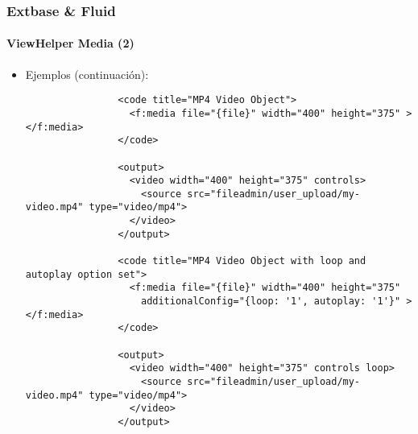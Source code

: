 \begin{frame}[fragile]
	\frametitle{Extbase \& Fluid}
	\framesubtitle{ViewHelper Media (2)}

	\lstset{basicstyle=\tiny\ttfamily}

	\begin{itemize}

		\item Ejemplos (continuación):

			\begin{lstlisting}
				<code title="MP4 Video Object">
				  <f:media file="{file}" width="400" height="375" ></f:media>
				</code>

				<output>
				  <video width="400" height="375" controls>
				    <source src="fileadmin/user_upload/my-video.mp4" type="video/mp4">
				  </video>
				</output>

				<code title="MP4 Video Object with loop and autoplay option set">
				  <f:media file="{file}" width="400" height="375"
				    additionalConfig="{loop: '1', autoplay: '1'}" ></f:media>
				</code>

				<output>
				  <video width="400" height="375" controls loop>
				    <source src="fileadmin/user_upload/my-video.mp4" type="video/mp4">
				  </video>
				</output>
			\end{lstlisting}

	\end{itemize}

\end{frame}


